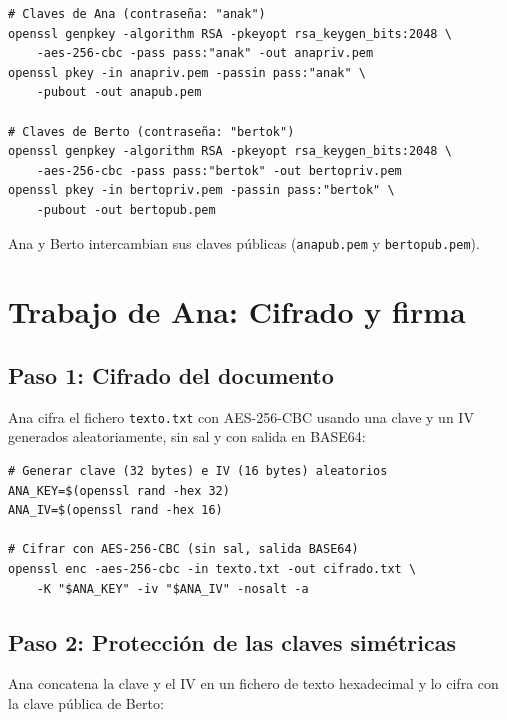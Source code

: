 \begin{lstlisting}[caption=Generación de claves RSA para Ana y Berto]
# Claves de Ana (contraseña: "anak")
openssl genpkey -algorithm RSA -pkeyopt rsa_keygen_bits:2048 \
    -aes-256-cbc -pass pass:"anak" -out anapriv.pem
openssl pkey -in anapriv.pem -passin pass:"anak" \
    -pubout -out anapub.pem

# Claves de Berto (contraseña: "bertok")
openssl genpkey -algorithm RSA -pkeyopt rsa_keygen_bits:2048 \
    -aes-256-cbc -pass pass:"bertok" -out bertopriv.pem
openssl pkey -in bertopriv.pem -passin pass:"bertok" \
    -pubout -out bertopub.pem
\end{lstlisting}

Ana y Berto intercambian sus claves públicas (\texttt{anapub.pem} y \texttt{bertopub.pem}).


\section{Trabajo de Ana: Cifrado y firma}

\subsection{Paso 1: Cifrado del documento}

Ana cifra el fichero \texttt{texto.txt} con AES-256-CBC usando una clave y un IV generados aleatoriamente, sin sal y con salida en BASE64:

\begin{lstlisting}[caption=Generación de clave/IV y cifrado del documento]
# Generar clave (32 bytes) e IV (16 bytes) aleatorios
ANA_KEY=$(openssl rand -hex 32)
ANA_IV=$(openssl rand -hex 16)

# Cifrar con AES-256-CBC (sin sal, salida BASE64)
openssl enc -aes-256-cbc -in texto.txt -out cifrado.txt \
    -K "$ANA_KEY" -iv "$ANA_IV" -nosalt -a
\end{lstlisting}

\subsection{Paso 2: Protección de las claves simétricas}

Ana concatena la clave y el IV en un fichero de texto hexadecimal y lo cifra con la clave pública de Berto:

